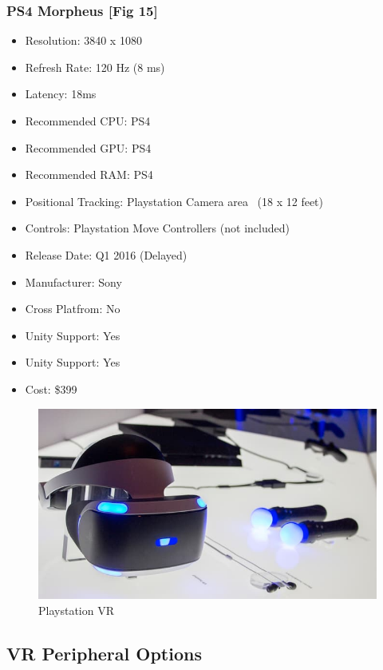 \documentclass[a4paper,10pt]{article}
\begin{document}
\subsubsection{PS4 Morpheus [Fig 15]}
\begin{itemize}
  \item Resolution: 3840 x 1080 
  \item Refresh Rate: 120 Hz (8 ms)
  \item Latency: 18ms
  \item Recommended CPU: PS4
  \item Recommended GPU: PS4
  \item Recommended RAM: PS4
  \item Positional Tracking: Playstation Camera area ~(18 x 12 feet)
  \item Controls: Playstation Move Controllers (not included)
  \item Release Date: Q1 2016 (Delayed)
  \item Manufacturer: Sony
  \item Cross Platfrom: No
    \item Unity Support: Yes
  \item Unity Support: Yes
  \item Cost: \$399
\end{itemize}
\begin{figure}[H]
	\includegraphics[width=\linewidth,height=\paperheight,keepaspectratio]{morpheus.jpg}
	\caption{Playstation VR}
	\label{fig:psvrImg}
\end{figure}
	\pagebreak
	
\pagebreak
\subsection{VR Peripheral Options}
\label{section:peripheral}
\end{document}
